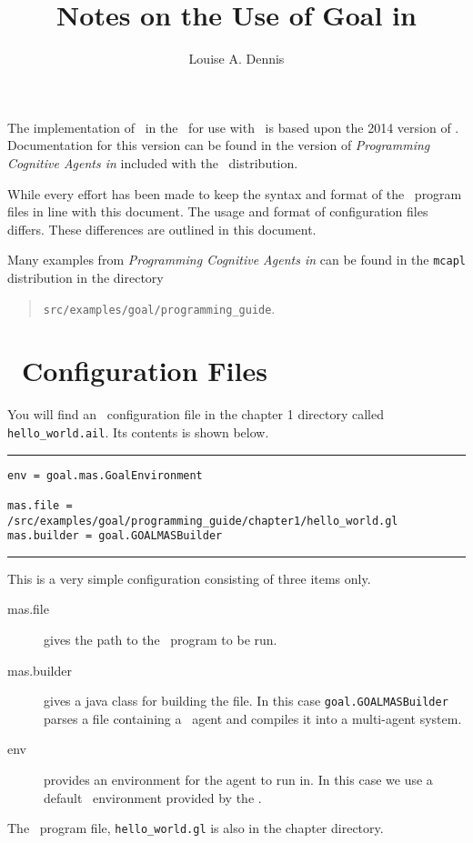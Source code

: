 \documentclass[a4]{article}
\title{Notes on the Use of {\sc Goal} in \ajpf}
\author{Louise A. Dennis}
\begin{document}
\maketitle

The implementation of \goal\ in the \ail\ for use with \ajpf\ is based upon the 2014 version of \goal.  Documentation for this version can be found in the version of \emph{Programming Cognitive Agents in \goal} included with the \ajpf\ distribution.

While every effort has been made to keep the syntax and format of the \goal\ program files in line with this document.  The usage and format of configuration files differs.  These differences are outlined in this document.

Many examples from \emph{Programming Cognitive Agents in \goal} can be found in the \texttt{mcapl} distribution in the directory
\begin{quote}
  \texttt{src/examples/goal/programming\_guide}.
\end{quote}

\section{\ail\ Configuration Files}
\label{sec:config}

\begin{sloppypar}
  You will find an \ail\ configuration file in the chapter 1 directory called \texttt{hello\_world.ail}.  Its contents is shown below.
  \end{sloppypar}

\noindent\rule{\textwidth}{1pt}
\begin{small}
\begin{verbatim}
env = goal.mas.GoalEnvironment

mas.file = /src/examples/goal/programming_guide/chapter1/hello_world.gl
mas.builder = goal.GOALMASBuilder
\end{verbatim}
\end{small}
\rule{\textwidth}{1pt}

This is a very simple configuration consisting of three items only.
\begin{sloppypar}
\begin{description}
\item[mas.file] gives the path to the \goal\ program to be run.
\item[mas.builder] gives a java class for building the file.  In this case \texttt{goal.GOALMASBuilder} parses a file containing a \goal\ agent and compiles it into a multi-agent system.
\item[env] provides an environment for the agent to run in.  In this case we use a default \goal\ environment provided by the \ail.
\end{description}
\end{sloppypar}
The \goal\ program file, \texttt{hello\_world.gl} is also in the chapter directory.
\end{document}
